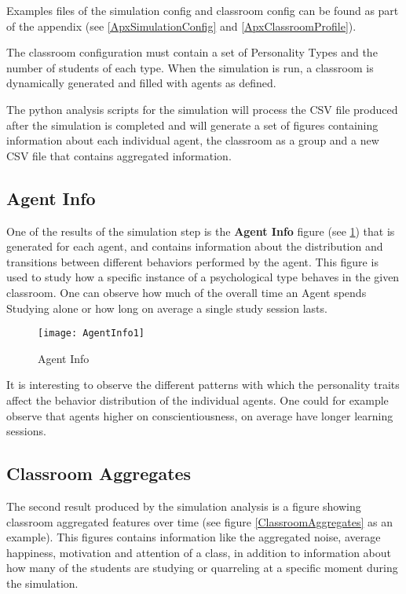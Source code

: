 Examples files of the simulation config and classroom config can be found as part of
the appendix (see \ref{ApxSimulationConfig} and \ref{ApxClassroomProfile}).

The classroom configuration must contain a set of Personality Types and the number
of students of each type. When the simulation is run, a classroom is dynamically
generated and filled with agents as defined.

The python analysis scripts for the simulation will process the CSV file produced
after the simulation is completed and will generate a set of figures containing information
about each individual agent, the classroom as a group and a new CSV file that contains
aggregated information.

\subsection{Agent Info}
One of the results of the simulation step is the \textbf{Agent Info} figure
(see \ref{AgentInfo}) that is generated for each agent, and contains information
about the distribution and transitions between different behaviors performed by the agent.
This figure is used to study how a specific instance of a psychological type behaves
in the given classroom. One can observe how much of the overall time an Agent
spends Studying alone or how long on average a single study session lasts.

\begin{figure}[H]
    \centering
    \texttt{[image: AgentInfo1]}
    \caption{Agent Info}
    \label{AgentInfo}
\end{figure}

It is interesting to observe the different patterns with which the personality traits
affect the behavior distribution of the individual agents. One could for example
observe that agents higher on conscientiousness, on average have longer
learning sessions.

\subsection{Classroom Aggregates}
The second result produced by the simulation analysis is a figure showing classroom
aggregated features over time (see figure \ref{ClassroomAggregates} as an example).
This figures contains information like the aggregated noise, average happiness,
motivation and attention of a class, in addition to information about how many of
the students are studying or quarreling at a specific moment during the simulation.

